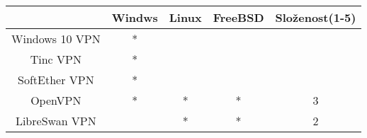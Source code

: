 \begin{center}
\begin{tabular}{c | c | c | c | c}
	 & \textbf{Windws} & \textbf{Linux} & \textbf{FreeBSD} &
         \textbf{Složenost(1-5)} \\
	 \hline

	Windows 10 VPN & * & & & \\
	\hline
        Tinc VPN & * & & & \\
	\hline
	SoftEther VPN & * & & & \\
	\hline
	OpenVPN & * & * & * & 3 \\
	\hline
	LibreSwan VPN & & *  & * & 2 \\
\end{tabular}
\end{center}
